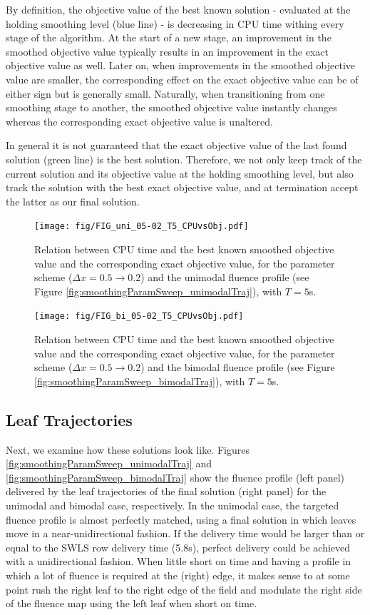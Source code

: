 \documentclass{iopart}
\begin{document}
By definition, the objective value of the best known solution - evaluated at the holding smoothing level (blue line) - is decreasing in CPU time withing every stage of the algorithm.
At the start of a new stage, an improvement in the smoothed objective value typically results in an improvement in the exact objective value as well.
Later on, when improvements in the smoothed objective value are smaller, the corresponding effect on the exact objective value can be of either sign but is generally small. 
Naturally, when transitioning from one smoothing stage to another, the smoothed objective value instantly changes whereas the corresponding exact objective value is unaltered.

In general it is not guaranteed that the exact objective value of the last found solution (green line) is the best solution.
Therefore, we not only keep track of the current solution and its objective value at the holding smoothing level, but also track the solution with the best exact objective value, and at termination accept the latter as our final solution.

\begin{figure}
  \centering
  \texttt{[image: fig/FIG\_uni\_05-02\_T5\_CPUvsObj.pdf]}
  \caption{Relation between CPU time and the best known smoothed objective value and the corresponding exact objective value, for the parameter scheme ($\Delta x= 0.5 \to 0.2$) and the unimodal fluence profile (see Figure \ref{fig:smoothingParamSweep_unimodalTraj}), with $T=5$s.}
  \label{fig:CPUvsObj_bestalpha_uni}
\end{figure}

\begin{figure}
  \centering
  \texttt{[image: fig/FIG\_bi\_05-02\_T5\_CPUvsObj.pdf]}
  \caption{Relation between CPU time and the best known smoothed objective value and the corresponding exact objective value, for the parameter scheme ($\Delta x= 0.5 \to 0.2$) and the bimodal fluence profile (see Figure \ref{fig:smoothingParamSweep_bimodalTraj}), with $T=5$s.}
  \label{fig:CPUvsObj_bestalpha_bi}
\end{figure}

\subsection{Leaf Trajectories}
Next, we examine how these solutions look like. 
Figures \ref{fig:smoothingParamSweep_unimodalTraj} and \ref{fig:smoothingParamSweep_bimodalTraj} show the fluence profile (left panel) delivered by the leaf trajectories of the final solution (right panel) for the unimodal and bimodal case, respectively.
In the unimodal case, the targeted fluence profile is almost perfectly matched, using a final solution in which leaves move in a near-unidirectional fashion.
If the delivery time would be larger than or equal to the SWLS row delivery time (5.8s), perfect delivery could be achieved with a unidirectional fashion.
When little short on time and having a profile in which a lot of fluence is required at the (right) edge,
    it makes sense to at some point rush the right leaf to the right edge of the field and modulate the right side of the fluence map using the left leaf when short on time.
    
\end{document}
